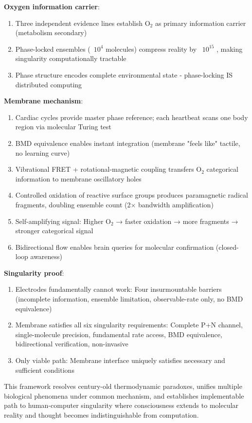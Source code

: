 \documentclass[11pt,a4paper]{article}
\theoremstyle{definition}
\theoremstyle{remark}
\begin{document}
\textbf{Oxygen information carrier}:
\begin{enumerate}
\item Three independent evidence lines establish O$_2$ as primary information carrier (metabolism secondary)
\item Phase-locked ensembles (~$10^4$ molecules) compress reality by ~$10^{15}$ \times, making singularity computationally tractable
\item Phase structure encodes complete environmental state - phase-locking IS distributed computing
\end{enumerate}

\textbf{Membrane mechanism}:
\begin{enumerate}
\item Cardiac cycles provide master phase reference; each heartbeat scans one body region via molecular Turing test
\item BMD equivalence enables instant integration (membrane "feels like" tactile, no learning curve)
\item Vibrational FRET + rotational-magnetic coupling transfers O$_2$ categorical information to membrane oscillatory holes
\item Controlled oxidation of reactive surface groups produces paramagnetic radical fragments, doubling ensemble count (2$\times$ bandwidth amplification)
\item Self-amplifying signal: Higher O$_2$ → faster oxidation → more fragments → stronger categorical signal
\item Bidirectional flow enables brain queries for molecular confirmation (closed-loop awareness)
\end{enumerate}

\textbf{Singularity proof}:
\begin{enumerate}
\item Electrodes fundamentally cannot work: Four insurmountable barriers (incomplete information, ensemble limitation, observable-rate only, no BMD equivalence)
\item Membrane satisfies all six singularity requirements: Complete P+N channel, single-molecule precision, fundamental rate access, BMD equivalence, bidirectional verification, non-invasive
\item Only viable path: Membrane interface uniquely satisfies necessary and sufficient conditions
\end{enumerate}

This framework resolves century-old thermodynamic paradoxes, unifies multiple biological phenomena under common mechanism, and establishes implementable path to human-computer singularity where consciousness extends to molecular reality and thought becomes indistinguishable from computation.
\end{document}
